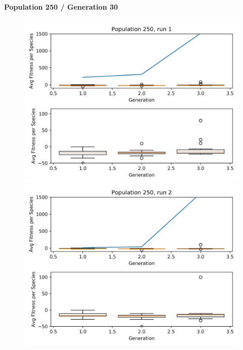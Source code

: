 		\paragraph{Population 250 / Generation 30}	
			\begin{figure}[h]
				\centering
				\begin{minipage}{0.33\textwidth}
					\centering
					\includegraphics[width=1\textwidth]{graphics/flappy/pop250_run1} %
				\end{minipage}\hfill
				\begin{minipage}{0.33\textwidth}
					\centering
					\includegraphics[width=1\textwidth]{graphics/flappy/pop250_run2} %
				\end{minipage}

\end{figure}
